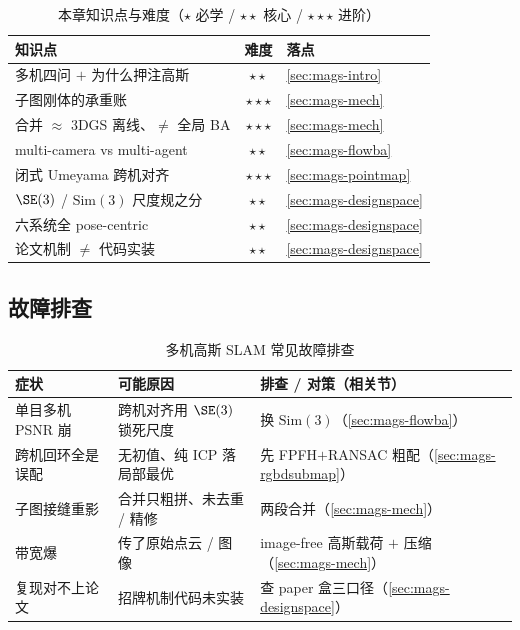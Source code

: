 \begin{table}[H]\centering
\caption{本章知识点与难度（$\star$ 必学 / $\star\star$ 核心 / $\star\star\star$ 进阶）}
\label{tab:mags-points}
\small
\begin{tabular}{@{}lcl@{}}
\toprule
知识点 & 难度 & 落点 \\
\midrule
多机四问 $+$ 为什么押注高斯 & $\star\star$ & \cref{sec:mags-intro} \\
子图刚体的承重账 & $\star\star\star$ & \cref{sec:mags-mech} \\
合并 $\approx$ 3DGS 离线、$\ne$ 全局 BA & $\star\star\star$ & \cref{sec:mags-mech} \\
multi-camera vs multi-agent & $\star\star$ & \cref{sec:mags-flowba} \\
闭式 Umeyama 跨机对齐 & $\star\star\star$ & \cref{sec:mags-pointmap} \\
$\SE(3)$ / $\mathrm{Sim}(3)$ 尺度规之分 & $\star\star$ & \cref{sec:mags-designspace} \\
六系统全 pose-centric & $\star\star$ & \cref{sec:mags-designspace} \\
论文机制 $\ne$ 代码实装 & $\star\star$ & \cref{sec:mags-designspace} \\
\bottomrule
\end{tabular}
\end{table}

\subsection{故障排查}

\begin{table}[H]\centering
\caption{多机高斯 SLAM 常见故障排查}
\label{tab:mags-trouble}
\small
\begin{tabular}{@{}p{3.2cm}p{4.2cm}p{4.6cm}@{}}
\toprule
症状 & 可能原因 & 排查 / 对策（相关节）\\
\midrule
单目多机 PSNR 崩 & 跨机对齐用 $\SE(3)$ 锁死尺度 & 换 $\mathrm{Sim}(3)$（\cref{sec:mags-flowba}）\\
跨机回环全是误配 & 无初值、纯 ICP 落局部最优 & 先 FPFH$+$RANSAC 粗配（\cref{sec:mags-rgbdsubmap}）\\
子图接缝重影 & 合并只粗拼、未去重 / 精修 & 两段合并（\cref{sec:mags-mech}）\\
带宽爆 & 传了原始点云 / 图像 & image-free 高斯载荷 $+$ 压缩（\cref{sec:mags-mech}）\\
复现对不上论文 & 招牌机制代码未实装 & 查 paper 盒三口径（\cref{sec:mags-designspace}）\\
\bottomrule
\end{tabular}
\end{table}

